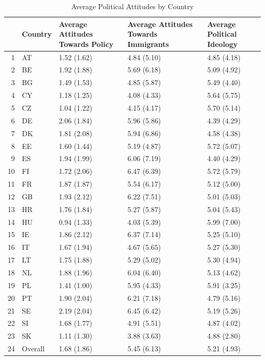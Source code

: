 \begin{table}[ht]
\centering
\begin{tabular}{rllll}
  \hline
 & Country & Average Attitudes Towards Policy & Average Attitudes Towards Immigrants & Average Political Ideology \\ 
  \hline
1 & AT & 1.52 (1.62) & 4.84 (5.10) & 4.85 (4.18) \\ 
  2 & BE & 1.92 (1.88) & 5.69 (6.18) & 5.09 (4.92) \\ 
  3 & BG & 1.49 (1.53) & 4.85 (5.87) & 5.49 (4.40) \\ 
  4 & CY & 1.18 (1.25) & 4.08 (4.33) & 5.64 (5.75) \\ 
  5 & CZ & 1.04 (1.22) & 4.15 (4.17) & 5.70 (5.14) \\ 
  6 & DE & 2.06 (1.84) & 5.96 (5.86) & 4.39 (4.29) \\ 
  7 & DK & 1.81 (2.08) & 5.94 (6.86) & 4.58 (4.38) \\ 
  8 & EE & 1.60 (1.44) & 5.19 (4.87) & 5.72 (5.07) \\ 
  9 & ES & 1.94 (1.99) & 6.06 (7.19) & 4.40 (4.29) \\ 
  10 & FI & 1.72 (2.06) & 6.47 (6.39) & 5.72 (5.79) \\ 
  11 & FR & 1.87 (1.87) & 5.54 (6.17) & 5.12 (5.00) \\ 
  12 & GB & 1.93 (2.12) & 6.22 (7.51) & 5.01 (5.03) \\ 
  13 & HR & 1.76 (1.84) & 5.27 (5.87) & 5.04 (5.43) \\ 
  14 & HU & 0.94 (1.33) & 4.03 (5.39) & 5.99 (7.00) \\ 
  15 & IE & 1.86 (2.12) & 6.37 (7.14) & 5.25 (5.10) \\ 
  16 & IT & 1.67 (1.94) & 4.67 (5.65) & 5.27 (5.30) \\ 
  17 & LT & 1.75 (1.88) & 5.29 (5.02) & 5.30 (4.94) \\ 
  18 & NL & 1.88 (1.96) & 6.04 (6.40) & 5.13 (4.62) \\ 
  19 & PL & 1.41 (1.00) & 5.95 (4.33) & 5.91 (3.25) \\ 
  20 & PT & 1.90 (2.04) & 6.21 (7.18) & 4.79 (5.16) \\ 
  21 & SE & 2.19 (2.04) & 6.45 (6.42) & 5.19 (5.26) \\ 
  22 & SI & 1.68 (1.77) & 4.91 (5.51) & 4.87 (4.02) \\ 
  23 & SK & 1.11 (1.30) & 3.88 (3.63) & 4.88 (2.80) \\ 
  24 & Overall & 1.68 (1.86) & 5.45 (6.13) & 5.21 (4.93) \\ 
   \hline
\end{tabular}
\caption{Average Political Attitudes by Country} 
\end{table}
